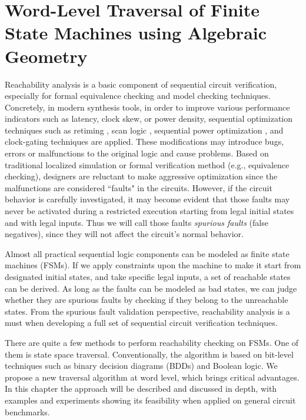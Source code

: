 \chapter{Word-Level Traversal of Finite State Machines using Algebraic Geometry}
\label{ch:reacha}
Reachability analysis is a basic component of sequential circuit verification, especially for 
formal equivalence checking and model checking techniques. Concretely, in modern synthesis 
tools, in order to improve various performance indicators such as latency, clock skew, or power
density, sequential optimization techniques such as retiming \cite{retiming}, scan logic \cite{scan},
sequential power optimization \cite{mathur2009power}, and clock-gating techniques \cite{clockgating} are applied.
These modifications may introduce bugs, errors or malfunctions to the original logic and cause problems. 
Based on traditional localized simulation or formal verification method (e.g., equivalence checking), 
designers are reluctant to make aggressive optimization
since the malfunctions are considered ``faults" in the circuits.
However, if the circuit behavior is carefully investigated, it may become evident that 
those faults may never be activated during a restricted execution starting 
from legal initial states and with legal inputs. Thus we will call those faults
{\it spurious faults} (false negatives), since they will not affect the circuit's normal behavior.

Almost all practical sequential logic components can be modeled as finite state machines (FSMs). 
If we apply constraints upon the machine to make it start from designated initial states, and 
take specific legal inputs, a set of reachable states can be derived. 
As long as the faults can be modeled as bad states, we can judge whether they are 
spurious faults by checking if they belong to the unreachable states. From the spurious fault validation 
perspective, reachability analysis is a must when developing a full set of sequential circuit verification
techniques.

There are quite a few methods to perform reachability checking on FSMs. One of them is 
state space traversal. Conventionally, the algorithm is based on bit-level techniques such as
binary decision diagrams (BDDs) and Boolean logic. We propose a new traversal algorithm at word level,
which brings critical advantages. In this chapter the approach will be described and discussed in depth, 
with examples and experiments showing its feasibility when applied on general circuit benchmarks.

